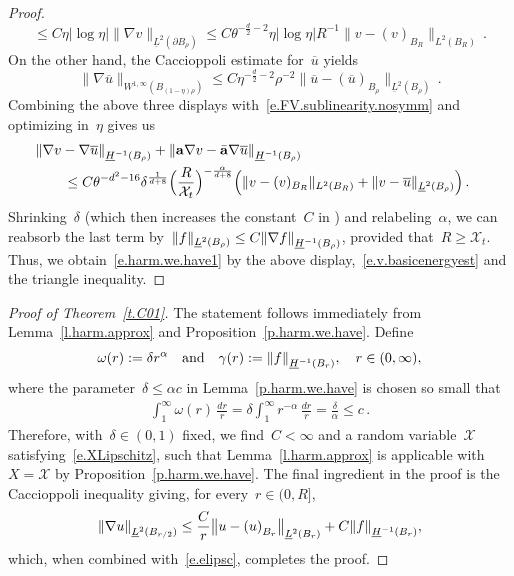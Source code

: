\documentclass[11pt,twoside]{article} %
\numberwithin{equation}{section}
\theoremstyle{definition}
\let\originalleft\left
\let\originalright\right
\renewcommand{\left}{\mathopen{}\mathclose\bgroup\originalleft}
\renewcommand{\right}{\aftergroup\egroup\originalright}
\renewcommand{\a}{\mathbf{a}}
\newcommand{\ahom}{\bar{\a}}
\newcommand{\X}{\mathcal{X}}
\begin{document}
\begin{proof}
\begin{equation*}
\leq 
C \eta | \log \eta| \| \nabla v \|_{\underline{L}^2(\partial B_{\rho})} 
\leq
C \theta^{-\frac d2-2} \eta | \log \eta| R^{-1} \| v - (v)_{B_R} \|_{L^2(B_{R})}\,.
\end{equation*}
On the other hand, the Caccioppoli estimate for~$\overline{u}$ yields
\begin{equation*} 
 \| \nabla \overline{u} \|_{W^{1,\infty}(B_{(1-\eta)\rho} ) }
 \leq 
C  \eta^{- \frac{d}{2} - 2}  \rho^{-2}
 \|  \overline{u} - (\overline{u})_{B_{\rho}}\|_{\underline{L}^{2}(B_{\rho} ) }  
 \,.
\end{equation*}
Combining the above three displays with~\eqref{e.FV.sublinearity.nosymm} and optimizing in~$\eta$ gives us
\begin{align*}
\lefteqn{  
\left\| \nabla v - \nabla \overline{u}  \right\|_{\underline{H}^{-1}(B_{\rho})} 
+
\left\| \a \nabla v - \ahom \nabla \overline{u}  \right\|_{\underline{H}^{-1}(B_{\rho})}} \qquad  
\notag \\ & 
\leq C \theta^{-d^2-16}  \delta^{\frac{1}{d+8}} \Bigl( \frac{R}{\X_t} \Bigr)^{-\frac{\alpha}{d+8}}   \Bigl( \| v - (v)_{B_R} \|_{L^2(B_{R})} + \| v - \overline{u}\|_{\underline{L}^{2}(B_{\rho} ) } \Bigr) \,.
\end{align*}
Shrinking~$\delta$ (which then increases the constant~$C$ in ) and relabeling~$\alpha$, we can reabsorb the last term by~$\| f \|_{\underline{L}^{2}(B_{\rho} ) } \leq C\left\| \nabla f  \right\|_{\underline{H}^{-1}(B_{\rho})}$,  provided that~$R \geq \X_t$. Thus, we obtain~\eqref{e.harm.we.have1} by the above display,~\eqref{e.v.basicenergyest} and the triangle inequality. 
\end{proof}


\begin{proof}[Proof of Theorem~\ref{t.C01}]
The statement follows immediately from Lemma~\ref{l.harm.approx} and Proposition~\ref{p.harm.we.have}. Define
\begin{align*}  
\omega(r) := \delta r ^{\alpha}  
\quad 
\mbox{and}
\quad
\gamma(r) := \left\|  f  \right\|_{\underline{H}^{-1}(B_r)},
\quad r\in (0,\infty),
\end{align*}
where the parameter~$\delta \leq \alpha c$ in Lemma~\ref{p.harm.we.have} is chosen so small that 
\begin{align*}  
\int_{1}^\infty \omega (r) \, \frac{dr}{r}  = \delta \int_{1}^\infty r^{-\alpha} \, \frac{dr}{r} = \frac{\delta}{\alpha} \leq c \,.
\end{align*}
Therefore, with~$\delta\in (0,1)$ fixed, we find~$C<\infty$ and a random variable~$\X$ satisfying~\eqref{e.XLipschitz}, such that  Lemma~\ref{l.harm.approx} is applicable with~$X = \X$ by Proposition~\ref{p.harm.we.have}.  The final ingredient in the proof is the Caccioppoli inequality giving, for every~$r \in (0,R]$, 
\begin{equation*} \label{}
\left\| \nabla u \right\|_{\underline{L}^2(B_{r/2})}
\leq 
\frac C{r} \left\| u - \left( u \right)_{B_{r}} \right\|_{\underline{L}^2(B_{r})} + C  \left\| f \right\|_{\underline{H}^{-1}(B_{r})},
\end{equation*}
which, when combined with~\eqref{e.elipsc}, completes the proof.
\end{proof}
\end{document}
